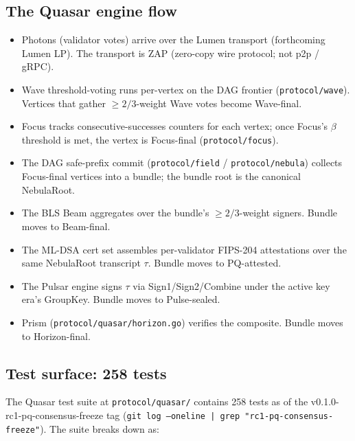 \subsection{The Quasar engine flow}

\begin{itemize}[leftmargin=2em,nosep]
  \item Photons (validator votes) arrive over the Lumen transport (forthcoming Lumen LP). The transport is ZAP \cite{lp020} (zero-copy wire protocol; not p2p / gRPC).
  \item Wave threshold-voting runs per-vertex on the DAG frontier (\texttt{protocol/wave}). Vertices that gather $\geq 2/3$-weight Wave votes become Wave-final.
  \item Focus tracks consecutive-successes counters for each vertex; once Focus's $\beta$ threshold is met, the vertex is Focus-final (\texttt{protocol/focus}).
  \item The DAG safe-prefix commit (\texttt{protocol/field} / \texttt{protocol/nebula}) collects Focus-final vertices into a bundle; the bundle root is the canonical NebulaRoot.
  \item The BLS Beam aggregates over the bundle's $\geq 2/3$-weight signers. Bundle moves to Beam-final.
  \item The ML-DSA cert set assembles per-validator FIPS-204 attestations over the same NebulaRoot transcript $\tau$. Bundle moves to PQ-attested.
  \item The Pulsar engine signs $\tau$ via Sign1/Sign2/Combine under the active key era's GroupKey. Bundle moves to Pulse-sealed.
  \item Prism (\texttt{protocol/quasar/horizon.go}) verifies the composite. Bundle moves to Horizon-final.
\end{itemize}

\subsection{Test surface: 258 tests}

The Quasar test suite at \texttt{protocol/quasar/} contains 258 tests as of the v0.1.0-rc1-pq-consensus-freeze tag (\texttt{git log --oneline | grep "rc1-pq-consensus-freeze"}). The suite breaks down as:


